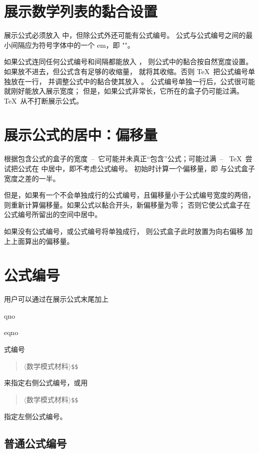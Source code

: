 \documentclass[a4paper]{rapport3}
\makeatletter
\def\gr#1{$\langle$#1$\rangle$}\def\key#1{{\tt#1}}
\def\ldash{\unskip\ --\nobreak\ \ignorespaces}
\def\rdash{\unskip\nobreak\ --\ \ignorespaces}
\newenvironment{Disp}{\begin{quotation}}{\end{quotation}}
\def\term#1\par{\index{#1}}
\def\cstoidx#1\par{\index{#1@\cs{#1}}}
\makeatother
\begin{document}
\section{展示数学列表的黏合设置}

展示公式必须放入  中，但除公式外还可能有公式编号。
公式与公式编号之间的最小间隔应为符号字体中的一个 em，即
\mdqon
{}""。
\mdqoff

如果公式连同任何公式编号和间隔都能放入 ，
则公式中的黏合按自然宽度设置。如果放不进去，但公式含有足够的收缩量，
就将其收缩。否则 \TeX\ 把公式编号单独放在一行，
并调整公式中的黏合使其放入 。
公式编号单独一行后，公式很可能就刚好能放入展示宽度；
但是，如果公式非常长，它所在的盒子仍可能过满。
\TeX\ 从不打断展示公式。

\section{展示公式的居中：偏移量}
根据包含公式的盒子的宽度\ldash 它可能并未真正“包含”公式；可能过满\rdash
\TeX\ 尝试把公式在  中居中，即不考虑公式编号。
初始时计算一个偏移量，即  与公式盒子宽度之差的一半。

但是，如果有一个不会单独成行的公式编号，且偏移量小于公式编号宽度的两倍，
则重新计算偏移量。如果公式以黏合开头，新偏移量为零；
否则它使公式盒子在公式编号所留出的空间中居中。

如果没有公式编号，或公式编号将单独成行，
则公式盒子此时放置为向右偏移  加上上面算出的偏移量。

\section{公式编号}

用户可以通过在展示公式末尾加上
\cstoidx eqno\par\cstoidx leqno\par\term 公式编号\par
\begin{Disp}\gr{数学模式材料}\verb>$$>\end{Disp}
来指定右侧公式编号，或用
\begin{Disp}\gr{数学模式材料}\verb>$$>\end{Disp}
指定左侧公式编号。

\subsection{普通公式编号}
\end{document}
